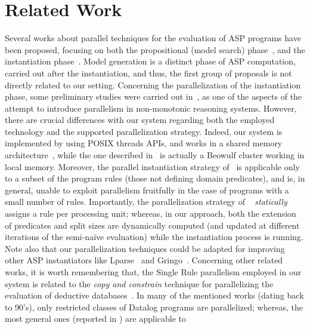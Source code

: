 \documentclass[preprint]{tlp}
\begin{document}
\section{Related Work}\label{sec:related}

Several works about parallel techniques for the evaluation of ASP
programs have been proposed, focusing on both
the propositional (model search) phase~\cite{fink-etal-2001,ellg-etal-2009,gres-etal-2005,pont-elkh-2001},
and  the instantiation
phase~\cite{bald-etal-2005-parallel,cali-etal-2008-joacil}. Model
generation is a distinct phase of  ASP computation, carried out
after the instantiation, and thus, the first group of proposals is
not directly related to our setting.
Concerning the parallelization of the instantiation phase, some preliminary
studies were carried out in~\cite{bald-etal-2005-parallel}, as one of the
aspects of the attempt to introduce parallelism in non-monotonic
reasoning systems. However, there are crucial differences with our
system regarding both the employed technology and the supported
parallelization strategy. Indeed, our system  is implemented by
using POSIX threads APIs, and works in a shared memory
architecture~\cite{stall-98}, while the one described
in~\cite{bald-etal-2005-parallel} is actually a
Beowulf cluster working in local memory. Moreover,
the parallel instantiation strategy
of~\cite{bald-etal-2005-parallel} is applicable only to a subset of
the program rules (those not defining domain predicates), and is, in
general, unable to exploit parallelism fruitfully in the case of
programs with a small number of rules. Importantly, the
parallelization strategy of ~\cite{bald-etal-2005-parallel} {\em
statically} assigns a rule per processing unit; whereas, in our
approach, both the extension of predicates and split sizes are
dynamically computed (and updated at different iterations of the
semi-na\"ive evaluation) while the instantiation process is running. Note also
that our parallelization techniques could be
adapted for improving other ASP instantiators
like Lparse~\cite{niem-simo-97} and Gringo~\cite{gebs-etal-2007-gringo}.
Concerning other related works, it is worth remembering that, the
Single Rule parallelism employed in our system is related to the
{\em copy and constrain} technique for parallelizing the evaluation of deductive
databases~\cite{wolf-silb-1988,wolf-ozer-90,gang-etal-90,zhan-etal-1995,dewa-etal-94}.
In many of the mentioned works (dating back to 90's), only restricted classes of
Datalog programs are parallelized; whereas, the most general ones
(reported in \cite{wolf-ozer-90,zhan-etal-1995}) are applicable to
\end{document}
